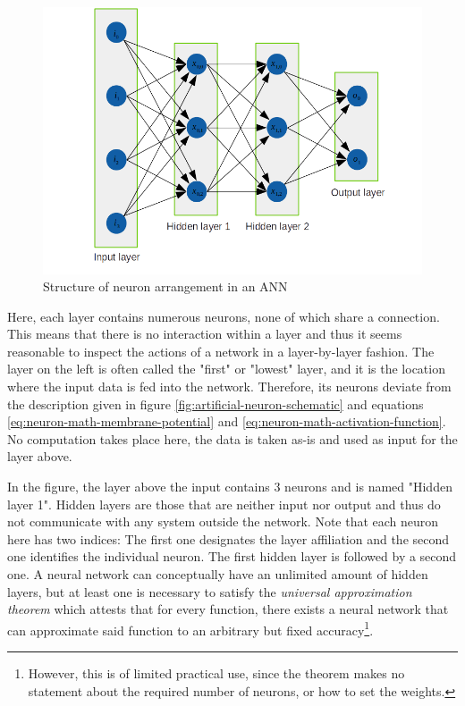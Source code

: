 \documentclass[11pt, a4paper]{article}
\begin{document}
\begin{figure}[h!tb]
\centering
\includegraphics[width=\textwidth]{images/network_layout.png}
\caption{Structure of neuron arrangement in an ANN}
\label{fig:neural-nework-structure}
\end{figure}

Here, each layer contains numerous neurons, none of which share a connection. This means that there is no interaction within a layer and thus it seems reasonable to inspect the actions of a network in a layer-by-layer fashion. The layer on the left is often called the "first" or "lowest" layer, and it is the location where the input data is fed into the network. Therefore, its neurons deviate from the description given in figure \ref{fig:artificial-neuron-schematic} and equations \eqref{eq:neuron-math-membrane-potential} and \eqref{eq:neuron-math-activation-function}. No computation takes place here, the data is taken as-is and used as input for the layer above.

In the figure, the layer above the input contains 3 neurons and is named "Hidden layer 1". Hidden layers are those that are neither input nor output and thus do not communicate with any system outside the network. Note that each neuron here has two indices: The first one designates the layer affiliation and the second one identifies the individual neuron. The first hidden layer is followed by a second one. A neural network can conceptually have an unlimited amount of hidden layers, but at least one is necessary to satisfy the \emph{universal approximation theorem} \cite{universal-approximator-theorem} which attests that for every function, there exists a neural network that can approximate said function to an arbitrary but fixed accuracy\footnote{However, this is of limited practical use, since the theorem makes no statement about the required number of neurons, or how to set the weights.}.
\end{document}
